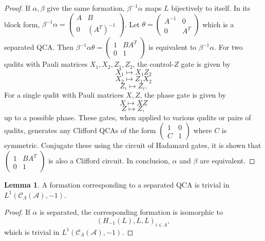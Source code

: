 \documentclass{article}
\theoremstyle{definition}
\newtheorem{lem}[theorem]{Lemma}
\newcommand{\CA}{{ \mathcal A}}
\def \al {\alpha}
\begin{document}
\begin{proof}
    If $\al, \beta$ give the same formation, $\beta^{-1}\al$ maps $L$ bijectively to itself. In its block form, 
    $\beta^{-1}\al=\begin{pmatrix}
        A & B\\
        0 & (A^T)^{-1}
    \end{pmatrix}$.  Let $\theta=\begin{pmatrix}
        A^{-1} & 0\\
        0 & A^T
    \end{pmatrix}$ which is a separated QCA. Then $ \beta^{-1}\al\theta=\begin{pmatrix}
        1 & BA^T\\
        0 & 1
    \end{pmatrix}$ is equivalent to $\beta^{-1}\al$. For two qudits with Pauli matrices $X_1, X_2, Z_1, Z_2$, the control-$Z$ gate is given by 
    $$X_1\mapsto X_1Z_2$$
    $$X_2 \mapsto Z_1X_2$$
    $$Z_i\mapsto Z_i.$$ For a single qudit with Pauli matrices $X, Z$, the phase gate is given by 
    $$X\mapsto XZ$$
    $$Z\mapsto Z,$$ up to a possible phase. 
    These gates, when applied to various qudits or pairs of qudits, generates any Clifford QCAs of the form 
    $ \begin{pmatrix}
        1 & 0\\
        C & 1
    \end{pmatrix}$ where $C$ is symmetric. Conjugate these using the circuit of Hadamard gates, it is shown that $ \begin{pmatrix}
        1 & BA^T\\
        0 & 1
    \end{pmatrix}$ is also a Clifford circuit. In conclusion, $\al$ and $\beta$ are equivalent. 
    
 \end{proof}

\begin{lem} \label{lem: septrivial}
    A formation corresponding to a separated QCA is trivial in $L^1(\mathcal{C}_{\Lambda}(\CA), -1)$.
\end{lem}

\begin{proof}
        
    If $\alpha$ is separated, the corresponding formation is isomorphic to
     $$\left(H_{-1}(L), L, L  \right)_{i\in \Lambda},$$ which is trivial in $L^1(\mathcal{C}_{\Lambda}(\CA), -1)$.
\end{proof}
\end{document}
